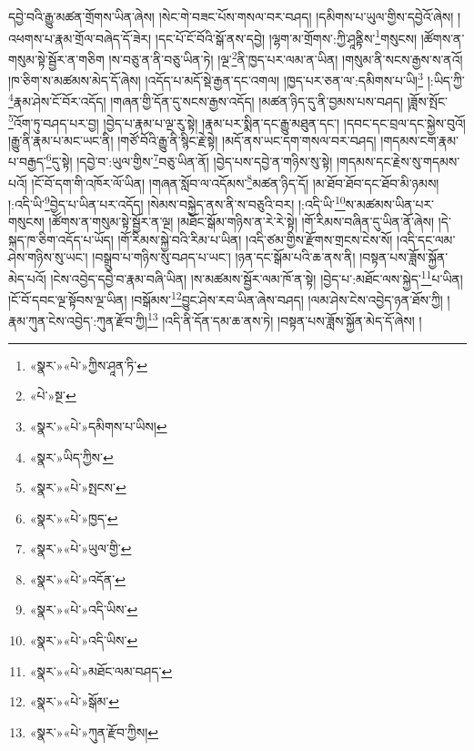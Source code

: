 དབྱེ་བའི་རྒྱུ་མཚན་གྲོགས་ཡིན་ཞེས། །སེང་གེ་བཟང་པོས་གསལ་བར་བཤད། །དམིགས་པ་ཡུལ་གྱིས་དབྱེའོ་ཞེས། །འཕགས་པ་རྣམ་གྲོལ་བཞེད་དོ་ཟེར། །དང་པོ་ངོ་བོའི་སྒོ་ནས་དབྱེ། །ལྷག་མ་གྲོགས་:ཀྱི་ཤཱནྟིས་\footnote{«སྣར་»«པེ་»ཀྱིས་ཤཱན་ཏི་}གསུངས། །ཚོགས་ན་གསུམ་སྟེ་སྦྱོར་ན་གཅིག །ས་བཅུ་ན་ནི་བཅུ་ཡིན་ཏེ། །ལྔ་\footnote{«པེ་»སྔ་}ནི་ཁྱད་པར་ལམ་ན་ཡིན། །གསུམ་ནི་སངས་རྒྱས་ས་ནའོ། །ཁ་ཅིག་ས་མཚམས་མེད་དོ་ཞེས། །འདོད་པ་མདོ་སྡེ་རྒྱན་དང་འགལ། །ཁྱད་པར་ཅན་ལ་:དམིགས་པ་ཡི།\footnote{«སྣར་»«པེ་»དམིགས་པ་ཡིས།} །:ཡིད་ཀྱི་\footnote{«སྣར་»ཡིད་ཀྱིས་}རྣམ་ཤེས་ངོ་བོར་འདོད། །གཞན་གྱི་དོན་དུ་སངས་རྒྱས་འདོད། །མཚན་ཉིད་དུ་ནི་བྱམས་པས་བཤད། །ཟློས་སྤོང་\footnote{«སྣར་»«པེ་»སྤངས་}འོག་ཏུ་བཤད་པར་བྱ། །བྱེད་པ་རྣམ་པ་ལྔ་རུ་སྟེ། །རྣམ་པར་སྨིན་དང་རྒྱུ་མཐུན་དང་། །དབང་དང་བྲལ་དང་སྐྱེས་བུའོ། །རྒྱུ་ནི་རྣམ་པ་མང་ཡང་ནི། །གཙོ་བོའི་རྒྱུ་ནི་སྙིང་རྗེ་སྟེ། །མདོ་ནས་ཡང་དག་གསལ་བར་བཤད། །གདམས་ངག་རྣམ་པ་བརྒྱད་\footnote{«སྣར་»«པེ་»ཁྱད་}དུ་སྟེ། །དབྱེ་བ་:ཡུལ་གྱིས་\footnote{«སྣར་»«པེ་»ཡུལ་གྱི་}བཅུ་ཡིན་ནོ། །བྱེད་པས་དབྱེ་ན་གཉིས་སུ་སྟེ། །གདམས་དང་རྗེས་སུ་གདམས་པའོ། །ངོ་བོ་དག་གི་འཁོར་ལོ་ཡིན། །གཞན་སློབ་ལ་འདོམས་\footnote{«སྣར་»«པེ་»འདོན་}མཚན་ཉིད་དོ། །མ་ཐོབ་ཐོབ་དང་ཐོབ་མི་ཉམས། །:འདི་ཡི་\footnote{«སྣར་»«པེ་»འདི་ཡིས་}བྱེད་པ་ཡིན་པར་འདོད། །སེམས་བསྐྱེད་ནས་ནི་ས་བཅུའི་བར། །:འདི་ཡི་\footnote{«སྣར་»«པེ་»འདི་ཡིས་}ས་མཚམས་ཡིན་པར་གསུངས། །ཚོགས་ན་གསུམ་སྟེ་སྦྱོར་ན་ལྔ། །མཐོང་སྒོམ་གཉིས་ན་རེ་རེ་སྟེ། །གོ་རིམས་བཞིན་དུ་ཡིན་ནོ་ཞེས། །དེ་སྐད་ཁ་ཅིག་འདོད་པ་ཡོད། །གོ་རིམས་སྐྱེ་བའི་རིམ་པ་ཡིན། །འདི་ཙམ་གྱིས་རྫོགས་གྲངས་ངེས་སོ། །འདི་དང་ལམ་ཤེས་གཉིས་སུ་ཡང་། །བསྒྲུབ་པ་གཉིས་སུ་བཤད་པ་ཡང་། །ཉན་དང་སྒོམ་པའི་ཆ་ནས་ནི། །བསྟན་པས་ཟློས་སྐྱོན་མེད་པའོ། །ངེས་འབྱེད་དབྱེ་བ་རྣམ་བཞི་ཡིན། །ས་མཚམས་སྦྱོར་ལམ་ཁོ་ན་སྟེ། །བྱེད་པ་:མཐོང་ལས་སྐྱེད་\footnote{«སྣར་»«པེ་»མཐོང་ལམ་བཤད་}པ་ཡིན། །ངོ་བོ་དབང་ལྔ་སྟོབས་ལྔ་ཡིན། །བསྒོམས་\footnote{«སྣར་»«པེ་»སྒོམ་}བྱུང་ཤེས་རབ་ཡིན་ཞེས་བཤད། །ལམ་ཤེས་ངེས་འབྱེད་ཉན་ཐོས་ཀྱི། །རྣམ་ཀུན་ངེས་འབྱེད་:ཀུན་རྫོབ་ཀྱི།\footnote{«སྣར་»«པེ་»ཀུན་རྫོབ་ཀྱིས།} །འདི་ནི་དོན་དམ་ཆ་ནས་ཏེ། །བསྟན་པས་ཟློས་སྐྱོན་མེད་དོ་ཞེས། །
